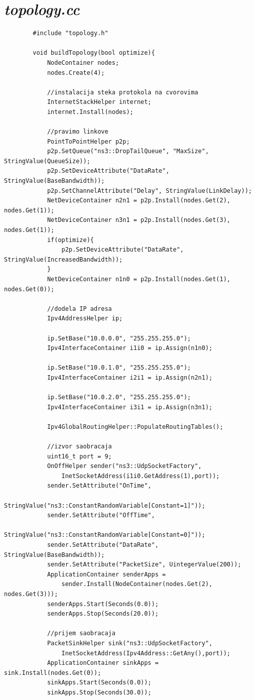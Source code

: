 \documentclass[a4paper, 12pt, projekat]{etf}
\begin{document}
	\section*{\emph{topology.cc}}
	\begin{verbatim}
		#include "topology.h"
		
		void buildTopology(bool optimize){
			NodeContainer nodes;
			nodes.Create(4);
			
			//instalacija steka protokola na cvorovima
			InternetStackHelper internet;
			internet.Install(nodes);
			
			//pravimo linkove
			PointToPointHelper p2p;
			p2p.SetQueue("ns3::DropTailQueue", "MaxSize", StringValue(QueueSize));
			p2p.SetDeviceAttribute("DataRate", StringValue(BaseBandwidth));
			p2p.SetChannelAttribute("Delay", StringValue(LinkDelay));
			NetDeviceContainer n2n1 = p2p.Install(nodes.Get(2), nodes.Get(1));
			NetDeviceContainer n3n1 = p2p.Install(nodes.Get(3), nodes.Get(1));
			if(optimize){
				p2p.SetDeviceAttribute("DataRate", StringValue(IncreasedBandwidth));
			}
			NetDeviceContainer n1n0 = p2p.Install(nodes.Get(1), nodes.Get(0));
			
			//dodela IP adresa
			Ipv4AddressHelper ip;
			
			ip.SetBase("10.0.0.0", "255.255.255.0");
			Ipv4InterfaceContainer i1i0 = ip.Assign(n1n0);
			
			ip.SetBase("10.0.1.0", "255.255.255.0");
			Ipv4InterfaceContainer i2i1 = ip.Assign(n2n1);
			
			ip.SetBase("10.0.2.0", "255.255.255.0");
			Ipv4InterfaceContainer i3i1 = ip.Assign(n3n1);
			
			Ipv4GlobalRoutingHelper::PopulateRoutingTables();
			
			//izvor saobracaja
			uint16_t port = 9;
			OnOffHelper sender("ns3::UdpSocketFactory", 
			    InetSocketAddress(i1i0.GetAddress(1),port));
			sender.SetAttribute("OnTime", 
			    StringValue("ns3::ConstantRandomVariable[Constant=1]"));
			sender.SetAttribute("OffTime", 
			    StringValue("ns3::ConstantRandomVariable[Constant=0]"));
			sender.SetAttribute("DataRate", StringValue(BaseBandwidth));
			sender.SetAttribute("PacketSize", UintegerValue(200));
			ApplicationContainer senderApps = 
			    sender.Install(NodeContainer(nodes.Get(2), nodes.Get(3)));
			senderApps.Start(Seconds(0.0));
			senderApps.Stop(Seconds(20.0));
			
			//prijem saobracaja
			PacketSinkHelper sink("ns3::UdpSocketFactory",
			    InetSocketAddress(Ipv4Address::GetAny(),port));
			ApplicationContainer sinkApps = sink.Install(nodes.Get(0));
			sinkApps.Start(Seconds(0.0));
			sinkApps.Stop(Seconds(30.0));
			

\end{verbatim}
\end{document}
